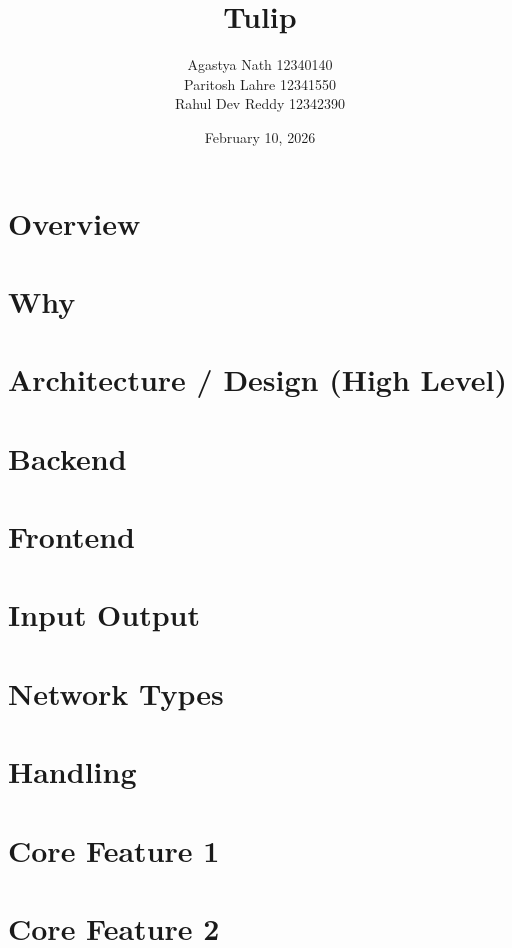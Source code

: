 \documentclass{beamer}
\title[Tulip]{Tulip}
\author[Group No 1]{Agastya Nath 12340140\\Paritosh Lahre 12341550\\ Rahul Dev Reddy 12342390}
\institute[IIT Bhilai]{Network Science\\Indian Institute of Technology Bhilai}
\date{February 10, 2026}
\begin{document}
	
	\begin{frame}
		\titlepage
	\end{frame}
\section{Overview}


\section{Why}


\section{Architecture / Design (High Level)}


\section{Backend}


\section{Frontend}


\section{Input Output}


\section{Network Types}


\section{Handling}


\section{Core Feature 1}


\section{Core Feature 2}

\end{document}
